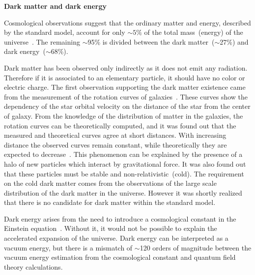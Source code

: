 
\textbf{Dark matter and dark energy}

Cosmological observations suggest that the ordinary matter and energy, described by the standard model, account for only $\sim 5\%$ of the total mass~(energy) of the universe~\cite{Bertone:2004pz, Bennett:2012zja}. The remaining $\sim$95\% is divided between the dark matter~($\sim$27\%) and dark energy~($\sim$68\%).

Dark matter has been observed only indirectly as it does not emit any radiation. Therefore if it is associated to an elementary particle, it should have no color or electric charge. The first observation supporting the dark matter existence came from the measurement of the rotation curves of galaxies~\cite{Zwicky:1937zza, Rubin:1980zd}. These curves show the dependency of the star orbital velocity on the distance of the star from the center of galaxy. From the knowledge of the distribution of matter in the galaxies, the rotation curves can be theoretically computed, and it was found out that the measured and theoretical curves agree at short distances. With increasing distance the observed curves remain constant, while theoretically they are expected to decrease~\cite{Bertone:2004pz}. This phenomenon can be explained by the presence of a halo of new particles which interact by gravitational force. It was also found out that these particles must be stable and non-relativistic~(cold). The requirement on the cold dark matter comes from the observations of the large scale distribution of the dark matter in the universe. However it was shortly realized that there is no candidate for dark matter within the standard model.

Dark energy arises from the need to introduce a cosmological constant in the Einstein equation~\cite{Sami:2009jx}. Without it, it would not be possible to explain the accelerated expansion of the universe. Dark energy can be interpreted as a vacuum energy, but there is a mismatch of $\sim$120 orders of magnitude between the vacuum energy estimation from the cosmological constant and quantum field theory calculations.

